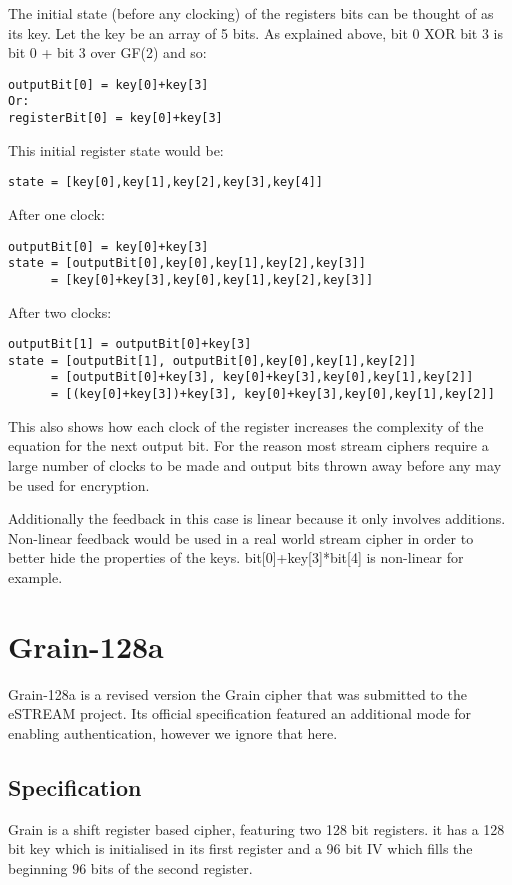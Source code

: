 \documentclass{report}
\begin{document}
The initial state (before any clocking) of the registers bits can be thought of as its key. Let the key be an array of 5 bits. As explained above, bit 0 XOR bit 3 is bit 0 + bit 3 over GF(2) and so:
\begin{verbatim}
outputBit[0] = key[0]+key[3]
Or:
registerBit[0] = key[0]+key[3]
\end{verbatim}
This initial register state would be:
\begin{verbatim}
state = [key[0],key[1],key[2],key[3],key[4]]
\end{verbatim}
After one clock:
\begin{verbatim}
outputBit[0] = key[0]+key[3]
state = [outputBit[0],key[0],key[1],key[2],key[3]]
      = [key[0]+key[3],key[0],key[1],key[2],key[3]]
\end{verbatim}
After two clocks:
\begin{verbatim}
outputBit[1] = outputBit[0]+key[3]
state = [outputBit[1], outputBit[0],key[0],key[1],key[2]]
      = [outputBit[0]+key[3], key[0]+key[3],key[0],key[1],key[2]]
      = [(key[0]+key[3])+key[3], key[0]+key[3],key[0],key[1],key[2]]
\end{verbatim}
This also shows how each clock of the register increases the complexity of the equation for the next output bit. For the reason most stream ciphers require a large number of clocks to be made and output bits thrown away before any may be used for encryption.

Additionally the feedback in this case is linear because it only involves additions. Non-linear feedback would be used in a real world stream cipher in order to better hide the properties of the keys. bit[0]+key[3]*bit[4] is non-linear for example.

\section{Grain-128a}
Grain-128a\cite{Grain128aSpec} is a revised version the Grain cipher that was submitted to the eSTREAM project. Its official specification featured an additional mode for enabling authentication, however we ignore that here.
\subsection{Specification}
Grain is a shift register based cipher, featuring two 128 bit registers. it has a 128 bit key which is initialised in its first register and a 96 bit IV which fills the beginning 96 bits of the second register.
\end{document}
